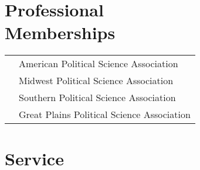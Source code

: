 \documentclass[margin,line,pifont,palatino,courier]{res}
\begin{document}
\begin{resume}








\section{\sc Professional\\ Memberships}

\begin{tabular}{@{}p{0.8in}p{4in}}

  & American Political Science Association\\
  & Midwest Political Science Association\\
  & Southern Political Science Association\\
  & Great Plains Political Science Association\\
\end{tabular}


\section{\sc Service}


\end{resume}
\end{document}
